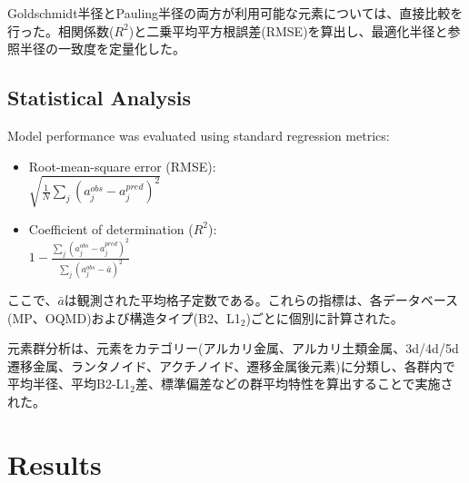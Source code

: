 \documentclass[a4paper,10pt,5p]{elsarticle}
\begin{document}
Goldschmidt半径とPauling半径の両方が利用可能な元素については、直接比較を行った。相関係数($R^2$)と二乗平均平方根誤差(RMSE)を算出し、最適化半径と参照半径の一致度を定量化した。


\subsection{Statistical Analysis}

Model performance was evaluated using standard regression metrics:
\begin{itemize}
\setlength{\parskip}{0cm} %
\setlength{\itemsep}{0cm} %
    \item Root-mean-square error (RMSE): \\$\sqrt{\frac{1}{N}\sum_j(a_j^{obs} - a_j^{pred})^2}$
    \item Coefficient of determination ($R^2$): \\$1 - \frac{\sum_j(a_j^{obs} - a_j^{pred})^2}{\sum_j(a_j^{obs} - \bar{a})^2}$
\end{itemize}

ここで、$\bar{a}$は観測された平均格子定数である。これらの指標は、各データベース(MP、OQMD)および構造タイプ(B2、L1$_2$)ごとに個別に計算された。

元素群分析は、元素をカテゴリー(アルカリ金属、アルカリ土類金属、3d/4d/5d遷移金属、ランタノイド、アクチノイド、遷移金属後元素)に分類し、各群内で平均半径、平均B2-L1$_2$差、標準偏差などの群平均特性を算出することで実施された。



\section{Results}
\end{document}
